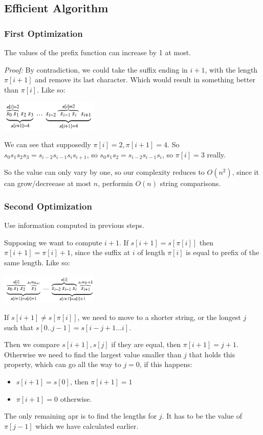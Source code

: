 \documentclass{IEEEtran}
\begin{document}
    \subsection{Efficient Algorithm}
      \subsubsection{First Optimization}
        The values of the prefix function can increase by 1 at most.\par 
        \textit{Proof:} By contradiction, we could take the suffix ending in $i+1$, with the length $\pi[i+1]$ and remove its last character. Which would result in something better than $\pi[i]$. Like so: 
        \begin{center}
          \includegraphics[width=0.35\textwidth]{prefixContradiction.png}
        \end{center}
        \par We can see that supposedly $\pi[i]=2,\pi[i+1]=4$. So $s_0s_1s_2s_3 = s_{i-2}s_{i-1}s_is_{i+1}$, so $s_0s_1s_2=s_{i-2}s_{i-1}s_i$, so $\pi[i]=3$ really.\par 
        So the value can only vary by one, so our complexity reduces to $O(n^2)$, since it can grow/decreease at most $n$, performin $O(n)$ string comparisons.
      \subsubsection{Second Optimization}
        Use information computed in previous steps.\par 
        Supposing we want to compute $i+1$. If $s[i+1]=s[\pi[i]]$ then $\pi[i+1]=\pi[i]+1$, since the suffix at $i$ of length $\pi[i]$ is equal to prefix of the same length. Like so:
        \begin{center}
          \includegraphics[width = 0.35\textwidth]{prefixOptExample.png}
        \end{center}
        \par If $s[i+1]\neq s[\pi[i]]$, we need to move to a shorter string, or the longest $j$ such that $s[0..j-1]=s[i-j+1...i]$.\par 
        Then we compare $s[i+1],s[j]$ if they are equal, then $\pi[i+1]=j+1$. Otherwise we need to find the largest value smaller than $j$ that holds this property, which can go all the way to $j=0$, if this happens:
        \begin{itemize}
          \item $s[i+1]=s[0]$, then $\pi[i+1]=1$
          \item $\pi[i+1]=0$ otherwise.
        \end{itemize}
        \par The only remaining apr is to find the lengths for $j$. It has to be the value of $\pi[j-1]$ which we have calculated earlier. 
\end{document}
